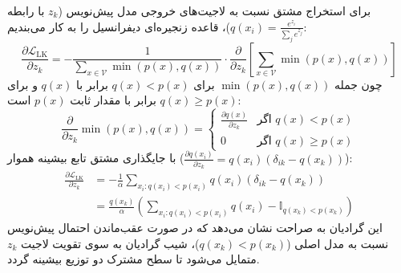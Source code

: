 برای استخراج مشتق نسبت به لاجیت‌های خروجی مدل پیش‌نویس ($z_k$ با رابطه $q(x_i) = \frac{e^{z_i}}{\sum_j e^{z_j}}$)، قاعده زنجیره‌ای دیفرانسیل را به کار می‌بندیم:
\begin{equation}
    \frac{\partial \mathcal{L}_{\text{LK}}}{\partial z_k} = - \frac{1}{\sum_{x \in \mathcal{V}} \min(p(x), q(x))} \cdot \frac{\partial}{\partial z_k} \left[ \sum_{x \in \mathcal{V}} \min(p(x), q(x)) \right]
\end{equation}
چون جمله $\min(p(x), q(x))$ برای $q(x) < p(x)$ برابر با $q(x)$ و برای $q(x) \ge p(x)$ برابر با مقدار ثابت $p(x)$ است:
\begin{equation}
    \frac{\partial}{\partial z_k} \min(p(x), q(x)) = \begin{cases} 
        \frac{\partial q(x)}{\partial z_k} & \text{اگر } q(x) < p(x) \\
        0 & \text{اگر } q(x) \ge p(x)
    \end{cases}
\end{equation}
با جایگذاری مشتق تابع بیشینه هموار ($\frac{\partial q(x_i)}{\partial z_k} = q(x_i)(\delta_{ik} - q(x_k))$):
\begin{equation}
\begin{aligned}
    \frac{\partial \mathcal{L}_{\text{LK}}}{\partial z_k} &= - \frac{1}{\alpha} \sum_{x_i: q(x_i) < p(x_i)} q(x_i) \left( \delta_{ik} - q(x_k) \right) \\
    &= \frac{q(x_k)}{\alpha} \left( \sum_{x_i: q(x_i) < p(x_i)} q(x_i) - \mathbb{I}_{q(x_k) < p(x_k)} \right)
\end{aligned}
\end{equation}
این گرادیان به صراحت نشان می‌دهد که در صورت عقب‌ماندن احتمال پیش‌نویس نسبت به مدل اصلی ($q(x_k) < p(x_k)$)، شیب گرادیان به سوی تقویت لاجیت $z_k$ متمایل می‌شود تا سطح مشترک دو توزیع بیشینه گردد.

